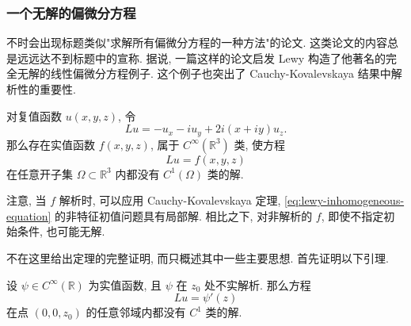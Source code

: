 \subsubsection{一个无解的偏微分方程}\label{subsec:pde-without-solutions}

不时会出现标题类似"求解所有偏微分方程的一种方法"的论文. 这类论文的内容总是远远达不到标题中的宣称. 据说, 一篇这样的论文启发 Lewy 构造了他著名的完全无解的线性偏微分方程例子. 这个例子也突出了 Cauchy-Kovalevskaya 结果中解析性的重要性.

\begin{Theorem}
\label{thm:lewy-nonsolvability}
对复值函数 $u(x,y,z)$, 令
\begin{equation}\label{eq:lewy-differential-operator}
Lu=-u_x-iu_y+2i(x+iy)u_z.
\end{equation}
那么存在实值函数 $f(x,y,z)$, 属于 $C^\infty(\mathbb{R}^3)$ 类, 使方程
\begin{equation}\label{eq:lewy-inhomogeneous-equation}
Lu=f(x,y,z)
\end{equation}
在任意开子集 $\Omega\subset\mathbb{R}^3$ 内都没有 $C^1(\Omega)$ 类的解.
\end{Theorem}

注意, 当 $f$ 解析时, 可以应用 Cauchy-Kovalevskaya 定理, \eqref{eq:lewy-inhomogeneous-equation} 的非特征初值问题具有局部解. 相比之下, 对非解析的 $f$, 即使不指定初始条件, 也可能无解.

不在这里给出定理的完整证明, 而只概述其中一些主要思想. 首先证明以下引理.

\begin{Lemma}
\label{lem:lewy-local-nonsolvability}
设 $\psi\in C^\infty(\mathbb{R})$ 为实值函数, 且 $\psi$ 在 $z_0$ 处不实解析. 那么方程
\begin{equation}\label{eq:lewy-local-obstruction-equation}
Lu=\psi'(z)
\end{equation}
在点 $(0,0,z_0)$ 的任意邻域内都没有 $C^1$ 类的解.
\end{Lemma}

